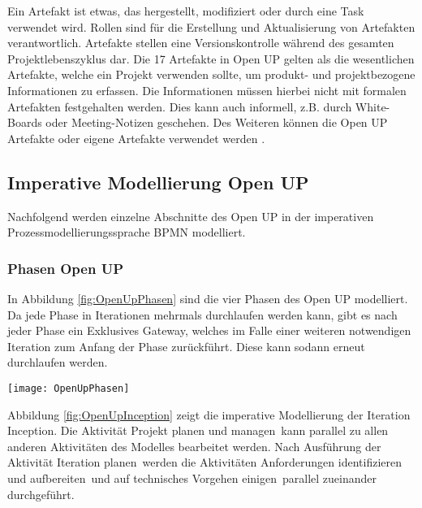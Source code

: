 Ein Artefakt ist etwas, das hergestellt, modifiziert oder durch eine Task verwendet wird. Rollen sind 
für die Erstellung und Aktualisierung von Artefakten verantwortlich. Artefakte stellen eine Versionskontrolle während des gesamten Projektlebenszyklus dar. Die 17 Artefakte in Open UP gelten als die wesentlichen Artefakte, welche ein Projekt verwenden sollte, um produkt- und projektbezogene Informationen zu erfassen. Die Informationen müssen hierbei nicht mit formalen Artefakten festgehalten werden. Dies kann auch informell, z.B. durch White-Boards oder Meeting-Notizen geschehen. Des Weiteren können die Open UP Artefakte oder eigene Artefakte verwendet werden \cite{eclipseopenup}.

\subsection{Imperative Modellierung Open UP}

Nachfolgend werden einzelne Abschnitte des Open UP in der imperativen Prozessmodellierungssprache BPMN modelliert.

 \subsubsection{Phasen Open UP}

In Abbildung \ref{fig:OpenUpPhasen} sind die vier Phasen des Open UP modelliert. Da jede Phase in Iterationen mehrmals durchlaufen werden kann, gibt es nach jeder Phase ein Exklusives Gateway, welches im Falle einer weiteren notwendigen Iteration zum Anfang der Phase zurückführt. Diese kann sodann erneut durchlaufen werden.

\begin{sidewaysfigure}[htp]
\begin{center}
  \texttt{[image: OpenUpPhasen]} %
  \caption{Phasen Open UP- imperativ}
  \label{fig:OpenUpPhasen}
\end{center}
\end{sidewaysfigure}

Abbildung \ref{fig:OpenUpInception} zeigt die imperative Modellierung der Iteration \grqq Inception\grqq. Die Aktivität \grqq Projekt planen und managen\grqq \ kann parallel zu allen anderen Aktivitäten des Modelles bearbeitet werden.\newline
Nach Ausführung der Aktivität \grqq Iteration planen\grqq \ werden die Aktivitäten \grqq Anforderungen identifizieren und aufbereiten\grqq \ und \grqq auf technisches Vorgehen einigen\grqq \ parallel zueinander durchgeführt.

